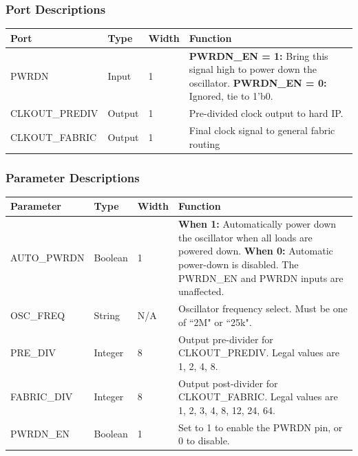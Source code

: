 \documentclass{article}
\begin{document}
\subsubsection{Port Descriptions}

\begin{tabularx}{5in}{|l|l|l|X|}
\hline
{\bfseries Port} & {\bfseries Type} & {\bfseries Width} & {\bfseries Function} \\
\hline
PWRDN & Input & 1 &
	{\bfseries PWRDN\_EN = 1:} \newline Bring this signal high to power down the oscillator. \newline
	{\bfseries PWRDN\_EN = 0:} \newline Ignored, tie to 1'b0.\\
\hline
CLKOUT\_PREDIV & Output & 1 & Pre-divided clock output to hard IP.  \\
\hline
CLKOUT\_FABRIC & Output & 1 & Final clock signal to general fabric routing\\
\hline
\end{tabularx}

\subsubsection{Parameter Descriptions}

\begin{tabularx}{5in}{|l|l|l|X|}
\hline
{\bfseries Parameter} & {\bfseries Type} & {\bfseries Width} & {\bfseries Function} \\
\hline
AUTO\_PWRDN & Boolean & 1 & 
	{\bfseries When 1: } \newline Automatically power down the oscillator when all loads are powered down. \newline
	{\bfseries When 0: } \newline Automatic power-down is disabled. The PWRDN\_EN and PWRDN inputs are unaffected.\\
\hline
OSC\_FREQ & String & N/A & Oscillator frequency select. Must be one of ``2M" or ``25k". \\
\hline
PRE\_DIV & Integer & 8 &
	Output pre-divider for CLKOUT\_PREDIV. Legal values are 1, 2, 4, 8. \\
\hline
FABRIC\_DIV & Integer & 8 &
	Output post-divider for CLKOUT\_FABRIC. Legal values are 1, 2, 3, 4, 8, 12, 24, 64. \\
\hline
PWRDN\_EN & Boolean & 1 & Set to 1 to enable the PWRDN pin, or 0 to disable. \\
\hline
\end{tabularx}
\end{document}
